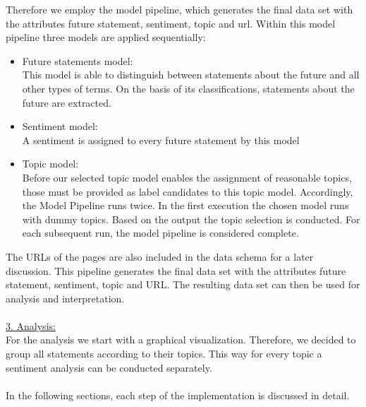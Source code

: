 Therefore we employ the model pipeline, which generates the final data set with the attributes future statement, sentiment, topic and url.
Within this model pipeline three models are applied sequentially:
\begin{itemize}
    \item Future statements model:\\
    This model is able to distinguish between statements about the future and all other types of terms.
On the basis of its classifications, statements about the future are extracted.
    \item Sentiment model:\\
A sentiment is assigned to every future statement by this model
    \item Topic model: \\
    Before our selected topic model enables the assignment of reasonable topics, those must be provided as label candidates to this topic model.
Accordingly, the Model Pipeline runs twice. In the first execution the chosen model runs with dummy topics. Based on the output the topic selection is conducted.
For each subsequent run, the model pipeline is considered complete.
\end{itemize}

The URLs of the pages are also included in the data schema for a later discussion. This pipeline generates the final data set with the attributes future statement, sentiment, topic and URL. The resulting data set can then be used for analysis and interpretation.
\\
\\
\underline{3. Analysis:}
\\
For the analysis we start with a graphical visualization.
Therefore, we decided to group all statements according to their topics.
This way for every topic a sentiment analysis can be conducted separately.
\\
\\
In the following sections, each step of the implementation is discussed in detail.


